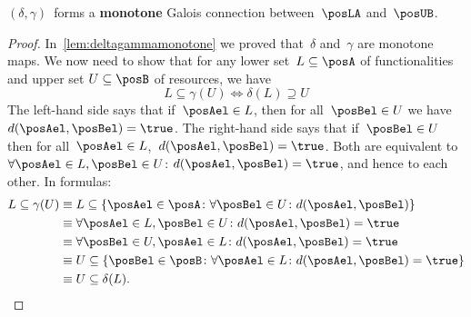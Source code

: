 \begin{lemma}
    $(\delta, \gamma)$~forms a \textbf{monotone}
    Galois connection between~$\posLA$ and~$\posUB$.
\end{lemma}
\begin{proof}
    In~\cref{lem:deltagammamonotone} we proved that~$\delta$ and~$\gamma$ are monotone maps.
    We now need to show that for any lower set~$L\subseteq \posA$ of functionalities and upper set $U\subseteq \posB$ of resources, we have
    \begin{equation}
        L\subseteq\gamma(U) \iff \delta(L)\supseteq U
    \end{equation}
    The left-hand side says that if~$\posAel\in L$, then for all~$\posBel \in U$ we have $d(\posAel,\posBel)=\true$.
    The right-hand side says that if~$\posBel\in U$ then for all~$\posAel \in L$,~$d(\posAel,\posBel)=\true$.
    Both are equivalent to~$\forall \posAel\in L,\posBel\in U$: $d(\posAel,\posBel)=\true$, and hence to each other.
    In formulas:
    \begin{equation}
        \begin{aligned}
            L \subseteq \gamma(U) & \equiv L\subseteq \{\posAel \in \posA\colon \forall \posBel\in U\colon d(\posAel,\posBel)\}       \\
                                  & \equiv \forall \posAel\in L, \posBel\in U \colon d(\posAel,\posBel)=\true                         \\
                                  & \equiv \forall \posBel\in U, \posAel\in L \colon d(\posAel,\posBel)=\true                         \\
                                  & \equiv U\subseteq \{\posBel\in \posB\colon \forall \posAel\in L\colon d(\posAel,\posBel)=\true \} \\
                                  & \equiv U\subseteq \delta(L).
        \end{aligned}
    \end{equation}
\end{proof}
